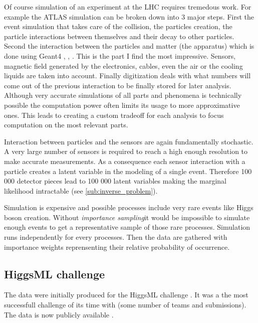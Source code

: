 Of course simulation of an experiment at the LHC requires tremedous work.
For example the ATLAS simulation \cite{Aad_2010} can be broken down into 3 major steps.
First the event simulation that takes care of the collision, the particles creation, the particle interactions between themselves and their decay to other particles.
Second the interaction between the particles and matter (the apparatus) which is done using Geant4 \cite{AGOSTINELLI2003250}, \cite{1610988}, \cite{ALLISON2016186}.
This is the part I find the most impressive.
Sensors, magnetic field generated by the electronics, cables, even the air or the cooling liquids are taken into account.
Finally digitization deals with what numbers will come out of the previous interaction to be finally stored for later analysis.
Although very accurate simulations of all parts and phenomena is technically possible the computation power often limits its usage to more approximative ones. 
This leads to creating a custom tradeoff for each analysis to focus computation on the most relevant parts.

Interaction between particles and the sensors are again fundamentally stochastic.
A very large number of sensors is required to reach a high enough resolution to make accurate measurements.
As a consequence each sensor interaction with a particle creates a latent variable in the modeling of a single event.
Therefore 100 000 detector pieces lead to 100 000 latent variables making the marginal likelihood intractable (see \autoref{sub:inverse_problem}).

Simulation is expensive and possible processes include very rare events like Higgs boson creation.
Without \emph{importance sampling}\needcite it would be impossible to simulate enough events to get a representative sample of those rare processes.
Simulation runs independently for every processes.
Then the data are gathered with importance weights reprensenting their relative probability of occurrence.





\subsection{HiggsML challenge} %
\label{sub:higgsml_challenge}


The data were initially produced for the HiggsML challenge \cite{Adam-Bourdarios2014}.
It was a the most successfull challenge of its time with (some number of teams and submissions).
The data is now publicly available \needcite.

